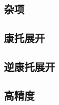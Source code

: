\documentclass{article}
\begin{document}
\begin{multicols*}{2}
\section{杂项}
\subsection{康托展开}

\subsection{逆康托展开}

\subsection{高精度}

\end{multicols*}
\end{document}

